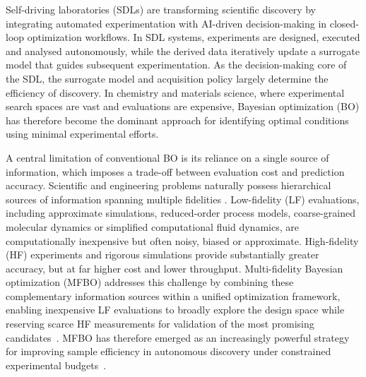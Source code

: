 \documentclass[11pt,a4paper]{article}%
\begin{document}
Self-driving laboratories (SDLs) are transforming scientific discovery by integrating automated experimentation with AI-driven decision-making in closed-loop optimization workflows. In SDL systems, experiments are designed, executed and analysed autonomously, while the derived data iteratively update a surrogate model that guides subsequent experimentation\citep{abolhasani2023rise,
hickman2025atlas}. As the decision-making core of the SDL, the surrogate model and acquisition policy largely determine the efficiency of discovery. In chemistry and
materials science, where experimental search spaces are vast and evaluations are expensive, Bayesian
optimization (BO) has therefore become the dominant approach for identifying optimal conditions using minimal experimental efforts\citep{shahriari2015taking}.

A central limitation of conventional BO is its reliance on a single source of information, which imposes a trade-off between evaluation cost and prediction accuracy. Scientific and engineering problems naturally possess hierarchical sources of information spanning multiple fidelities \citep{peherstorfer2018survey}. Low-fidelity (LF) evaluations, including approximate simulations, reduced-order process models, coarse-grained molecular dynamics or simplified computational fluid dynamics, are computationally inexpensive but often noisy, biased or approximate. High-fidelity (HF) experiments and rigorous simulations provide substantially greater accuracy, but at far higher cost and lower throughput. Multi-fidelity Bayesian optimization (MFBO) addresses this challenge by combining these complementary information sources within a unified optimization framework, enabling  inexpensive LF evaluations to broadly explore the
design space while reserving scarce HF measurements for validation of the most promising
candidates~\citep{kennedy2000predicting}. MFBO has therefore emerged as an increasingly powerful strategy for
improving sample efficiency in autonomous discovery under constrained experimental budgets~\citep{sabanza2025best}.
\end{document}
